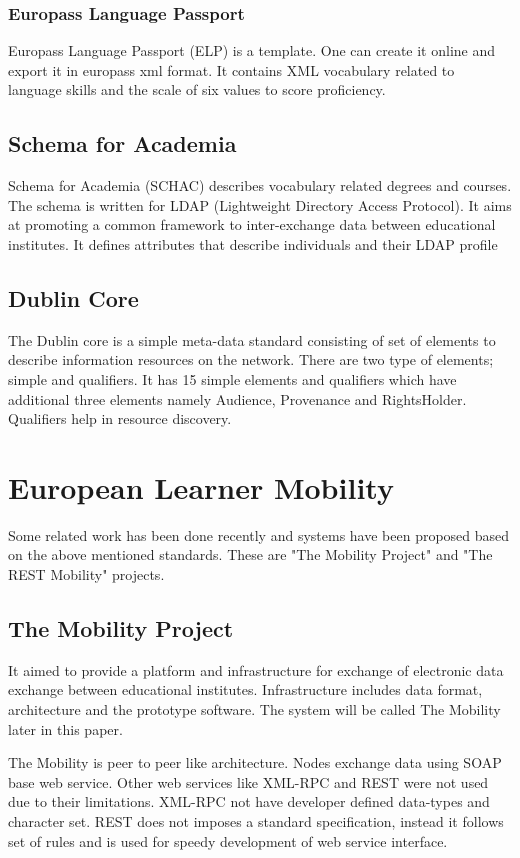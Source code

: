 \documentclass[12pt,a4paper,oneside]{book} %
\begin{document}
        \subsubsection{Europass Language Passport}
        Europass Language Passport (ELP) is a template. One can create it online and export it in europass xml format. It contains XML vocabulary related to language skills and the scale of six values to score proficiency.

    \subsection{Schema for Academia}
    Schema for Academia (SCHAC) describes vocabulary related degrees and courses. The schema is written for LDAP (Lightweight Directory Access Protocol). It aims at promoting a common framework to inter-exchange data between educational institutes. It defines attributes that describe individuals and their LDAP profile

    \subsection{Dublin Core}
    The Dublin core is a simple meta-data standard consisting of set of elements to describe information resources on the network. There are two type of elements; simple and qualifiers. It has 15 simple elements and qualifiers which have additional three elements namely Audience, Provenance and RightsHolder. Qualifiers help in resource discovery.

\section{European Learner Mobility}
Some related work has been done recently and systems have been proposed based on the above mentioned standards. These are "The Mobility Project" and "The REST Mobility" projects.

    \subsection{The Mobility Project}
    It aimed to provide a platform and infrastructure for exchange of electronic data exchange between educational institutes. Infrastructure includes data format, architecture and the prototype software. The system will be called The Mobility later in this paper.

    The Mobility is peer to peer like architecture. Nodes exchange data using SOAP base web service. Other web services like XML-RPC and REST were not used due to their limitations. XML-RPC not have developer defined data-types and character set. REST does not imposes a standard specification, instead it follows set of rules and is used for speedy development of web service interface.
\end{document}
